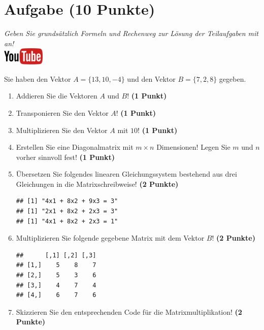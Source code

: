 \documentclass[a4paper, 10pt]{scrartcl}\usepackage[]{graphicx}\usepackage[]{xcolor}
\makeatletter
\newenvironment{kframe}{%
 \def\at@end@of@kframe{}%
 \ifinner\ifhmode%
  \def\at@end@of@kframe{\end{minipage}}%
  \begin{minipage}{\columnwidth}%
 \fi\fi%
 \def\FrameCommand##1{\hskip\@totalleftmargin \hskip-\fboxsep
 \colorbox{shadecolor}{##1}\hskip-\fboxsep
     \hskip-\linewidth \hskip-\@totalleftmargin \hskip\columnwidth}%
 \MakeFramed {\advance\hsize-\width
   \@totalleftmargin\z@ \linewidth\hsize
   \@setminipage}}%
 {\par\unskip\endMakeFramed%
 \at@end@of@kframe}
\newenvironment{knitrout}{}{} %
\makeatother
\begin{document}
  
\clearpage

\section{Aufgabe \hfill (10 Punkte)}

\textit{Geben Sie grunds{\"a}tzlich Formeln und Rechenweg zur L{\"o}sung der
  Teilaufgaben mit an!} \\[1Ex]

\hfill\href{https://youtu.be/x_MwWJoEsME}{\includegraphics[width =
  2cm]{img/youtube}} %
\hspace{2Ex}



Sie haben den Vektor $A = \{13, 10, -4\}$ und den Vektor $B = \{7, 2, 8\}$ gegeben.

\begin{enumerate}
\item Addieren Sie die Vektoren $A$ und $B$! \textbf{(1 Punkt)}
\item Transponieren Sie den Vektor $A$!
  \textbf{(1 Punkt)} 
\item Multiplizieren Sie den Vektor $A$ mit
  $10$! \textbf{(1 Punkt)}
\item Erstellen Sie eine Diagonalmatrix mit $m \times n$ Dimensionen!
  Legen Sie $m$ und $n$ vorher sinnvoll fest! \textbf{(1 Punkt)}
\item {\"U}bersetzen Sie folgendes linearen Gleichungssystem bestehend aus drei
  Gleichungen in die Matrixschreibweise! \textbf{(2 Punkte)}
\begin{knitrout}
\color{fgcolor}\begin{kframe}
\begin{verbatim}
## [1] "4x1 + 8x2 + 9x3 = 3"
## [1] "2x1 + 8x2 + 2x3 = 3"
## [1] "4x1 + 8x2 + 2x3 = 1"
\end{verbatim}
\end{kframe}
\end{knitrout}
\item Multiplizieren Sie folgende gegebene Matrix mit dem Vektor $B$!
  \textbf{(2 Punkte)}
\begin{knitrout}
\color{fgcolor}\begin{kframe}
\begin{verbatim}
##      [,1] [,2] [,3]
## [1,]    5    8    7
## [2,]    5    3    6
## [3,]    4    7    4
## [4,]    6    7    6
\end{verbatim}
\end{kframe}
\end{knitrout}
\item Skizzieren Sie den entsprechenden \Rlogo Code f{\"u}r die
  Matrixmultiplikation! \textbf{(2 Punkte)}
\end{enumerate}

\clearpage\null

 
\clearpage
\end{document}
